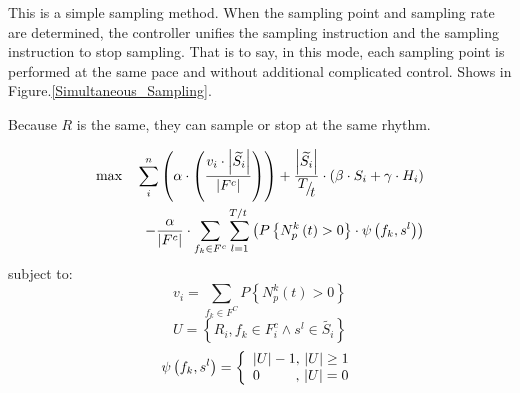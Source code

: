 \documentclass[conference,compsoc]{IEEEtran}
\begin{document}
This is a simple sampling method. When the sampling point and sampling rate are determined, the controller unifies the sampling instruction and the sampling instruction to stop sampling. That is to say, in this mode, each sampling point is performed at the same pace and without additional complicated control. Shows in Figure.\ref{Simultaneous_Sampling}.

Because $R $ is the same, they can sample or stop at the same rhythm.

\begin{equation}
\begin{split}
\max \quad {\sum\limits_i^n {\left( {\alpha  \cdot \left( {\frac{{{v_i} \cdot \left| {\widetilde {{S_i}}} \right|}}{{\left| {{F^c}} \right|}}} \right)} \right)}  + \frac{{\left| {\widetilde {{S_i}}} \right|}}{{{\raise0.7ex\hbox{$T$} \!\mathord{\left/
 {\vphantom {T t}}\right.\kern-\nulldelimiterspace}
\!\lower0.7ex\hbox{$t$}}}} \cdot \left( {\beta  \cdot {S_i} + \gamma  \cdot {H_i}} \right)} \\
-\frac{\alpha }{\left| {{F}^{c}} \right|}\cdot \sum\limits_{{{f}_{k}}\in {{F}^{c}}}{\sum\limits_{l=1}^{{T}/{t}\;}{\left( P\left\{ N_{p}^{k}\left( t \right)>0 \right\}\cdot \psi \left( {{f}_{k}},{{s}^{l}} \right) \right)}}
\end{split}
\end{equation}
subject to:
\begin{equation}
{v_i} = \sum\limits_{{f_k} \in {F^C}} {P\left\{ {N_p^k\left( t \right) > 0} \right\}}
\end{equation}
\begin{equation}
U = \left\{ {{R_i},{f_k} \in F_i^c \wedge {s^l} \in \widetilde {{S_i}}} \right\}
\end{equation}
\begin{equation}
\psi \left( {{f_k},{s^l}} \right) = \left\{ \begin{array}{l}
\left| U \right| - 1,{\rm{    }}\left| U \right| \ge 1\\
{\rm{   }}0\quad \quad \; \; ,\, \left| U \right| = 0
\end{array} \right.
\end{equation}
\end{document}
